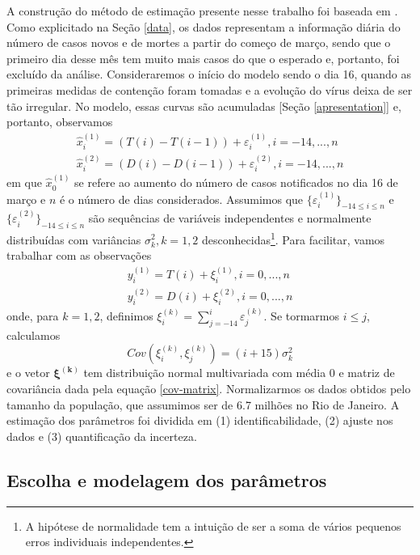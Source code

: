A construção do método de estimação presente nesse trabalho foi baseada em \cite{cao2012, liang2010, ramsey2007}. 
Como explicitado na Seção \ref{data}, os dados representam a informação diária do número de casos novos e de mortes a partir do começo de março, sendo que o primeiro dia desse mês tem muito mais casos do que o esperado e, portanto, foi excluído da análise. 
Consideraremos o início do modelo sendo o dia 16, quando as primeiras medidas de contenção foram tomadas \cite{decreto-emergencia} e a evolução do vírus deixa de ser tão irregular.
No modelo, essas curvas são acumuladas [Seção  \ref{apresentation}] e, portanto, observamos 
\begin{align}
    \hat{x}^{(1)}_i = (T(i) - T(i-1)) + \varepsilon^{(1)}_i, i = -14, ..., n
    \label{obsT1}
    \\
    \hat{x}^{(2)}_i = (D(i) - D(i-1)) + \varepsilon^{(2)}_i, i = -14, ..., n
    \label{obsD1}
\end{align}
em que $\hat{x}_0^{(1)}$ se refere ao aumento do número de casos notificados no dia 16 de março e $n$ é o número de dias considerados. 
Assumimos que $\{\varepsilon^{(1)}_i\}_{-14 \le i \le n}$ e $\{\varepsilon^{(2)}_i\}_{-14 \le i \le n}$ são sequências de variáveis independentes e normalmente distribuídas com variâncias $\sigma_k^2, k = 1,2$ desconhecidas\footnote{A hipótese de normalidade tem a intuição de ser a soma de vários pequenos erros individuais independentes.}. 
Para facilitar, vamos trabalhar com as observações 
\begin{align}
    y^{(1)}_i = T(i) + \xi^{(1)}_i, i = 0, ..., n
    \label{obsT}
    \\
    y^{(2)}_i = D(i) + \xi^{(2)}_i, i = 0, ..., n
    \label{obsD}
\end{align}
onde, para $k=1,2$, definimos $\xi_i^{(k)} = \sum_{j=-14}^i
\varepsilon_j^{(k)}$. Se tormarmos $i \le j$, calculamos 
\begin{equation} 
    \label{cov-matrix}
    Cov(\xi_i^{(k)}, \xi_j^{(k)}) = (i + 15)\sigma_k^2
\end{equation}
e o vetor $\boldsymbol{\xi^{(k)}}$ tem distribuição normal multivariada com média 0 e matriz de covariância dada pela equação \eqref{cov-matrix}. 
Normalizarmos os dados obtidos pelo tamanho da população, que assumimos ser de 6.7 milhões \cite{ibge-rio} no Rio de Janeiro. 
A estimação dos parâmetros foi dividida em (1) identificabilidade, (2) ajuste nos dados e (3) quantificação da incerteza.

\subsection{Escolha e modelagem dos parâmetros}

